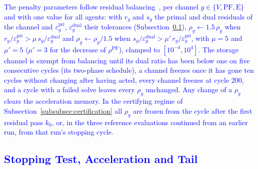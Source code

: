 \documentclass[preprint,12pt]{elsarticle}
\begin{document}
\textcolor{blue}{
    The penalty parameters follow residual balancing~\cite{boyd_admm_2011}, per channel $g \in \{V, \text{PF}, \text{E}\}$ and with one value for all agents: with $r_g$ and $s_g$ the primal and dual residuals of the channel and $\varepsilon^{\text{pri}}_g$, $\varepsilon^{\text{dual}}_g$ their tolerances (Subsection~\ref{app:admm_updated_stopping}), $\rho_g \gets 1.5\,\rho_g$ when $r_g/\varepsilon^{\text{pri}}_g > \mu\, s_g/\varepsilon^{\text{dual}}_g$ and $\rho_g \gets \rho_g/1.5$ when $s_g/\varepsilon^{\text{dual}}_g > \mu'\, r_g/\varepsilon^{\text{pri}}_g$, with $\mu = 5$ and $\mu' = 5$ ($\mu' = 3$ for the decrease of $\rho^{\text{PF}}$), clamped to $[10^{-4}, 10^{4}]$. The storage channel is exempt from balancing until its dual ratio has been below one on five consecutive cycles (its two-phase schedule), a channel freezes once it has gone ten cycles without changing after having acted, every channel freezes at cycle 200, and a cycle with a failed solve leaves every $\rho_g$ unchanged. Any change of a $\rho_g$ clears the acceleration memory. In the certifying regime of Subsection~\ref{subsubsec:certification} all $\rho_g$ are frozen from the cycle after the first residual pass $k_0$, or, in the three reference evaluations continued from an earlier run, from that run's stopping cycle.
}

\subsection{\textcolor{blue}{Stopping Test, Acceleration and Tail}}
\label{app:admm_updated_stopping}
\end{document}

